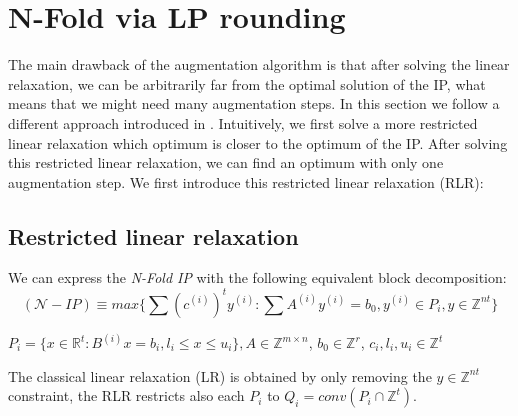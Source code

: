 \section{N-Fold via LP rounding} 

The main drawback of the augmentation algorithm is that after solving the linear relaxation, we can be arbitrarily far from the optimal solution of the IP, what means that we might need many augmentation steps. In this section we follow a different approach introduced in \cite{EISENBRAND:2020}. Intuitively, we first solve a more restricted linear relaxation which optimum is closer to the optimum of the IP. After solving this restricted linear relaxation, we can find an optimum with only one augmentation step. We first introduce this restricted linear relaxation (RLR):


\subsection{Restricted linear relaxation}

We can express the \emph{N-Fold IP} with the following equivalent block decomposition:
\begin{equation*}
    (\mathcal{N}-IP) \equiv max\{\sum (c^{(i)})^t y^{(i)} : \sum A^{(i)} y^{(i)} = b_0, y^{(i)} \in P_i, y \in \mathbb{Z}^{nt} \}
\end{equation*}
\vspace{-50pt}
\begin{center}
$P_i = \{x \in \mathbb{R}^t: B^{(i)}x = b_i, l_i \leq x \leq u_i \}, A \in \mathbb{Z}^{m \times n}$, $b_0 \in \mathbb{Z}^r$, $c_i,l_i,u_i \in \mathbb{Z}^t$
\end{center}

The classical linear relaxation (LR) is obtained by only removing the $y \in \mathbb{Z}^{nt}$ constraint, the RLR restricts also each $P_i$ to $Q_i = conv(P_i \cap \mathbb{Z}^t)$.

